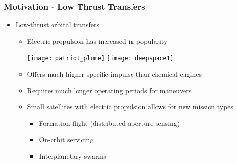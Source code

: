 \begin{frame} %
\frametitle{Motivation - Low Thrust Transfers} %
\begin{itemize}
    \item Low-thrust orbital transfers
    \begin{itemize}
        \item Electric propulsion has increased in popularity

        \texttt{[image: patriot\_plume]}
        \hfill
        \texttt{[image: deepspace1]}
 
        \item Offers much higher specific impulse than chemical engines 
        
        \item Requires much longer operating periods for maneuvers 
        \item Small satellites with electric propulsion allows for new mission types
            \begin{itemize}
                \item Formation flight (distributed aperture sensing)
                \item On-orbit servicing
                \item Interplanetary swarms
            \end{itemize}
    \end{itemize}
\end{itemize}
\end{frame}   %

